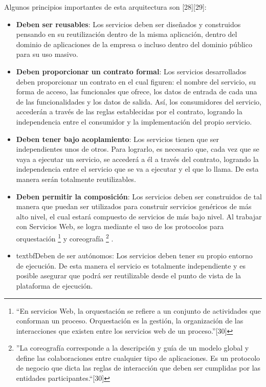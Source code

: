 Algunos principios importantes de esta arquitectura son [28][29]:
\begin{itemize}
 \item \textbf{Deben ser reusables}: Los servicios deben ser diseñados y construidos pensando en su reutilización dentro de la misma 
    aplicación, dentro del dominio de aplicaciones de la empresa o incluso dentro del dominio público para su uso masivo.
    
 \item \textbf{Deben proporcionar un contrato formal}: Los servicios desarrollados deben proporcionar un contrato en el cual figuren: 
    el nombre del servicio, su forma de acceso, las funcionales que ofrece, los datos de entrada de cada una de las funcionalidades y 
    los datos de salida. Así, los consumidores del servicio, accederán a través de las reglas establecidas por el contrato, logrando 
    la independencia entre el consumidor y la implementación del propio servicio.
    
 \item \textbf{Deben tener bajo acoplamiento}: Los servicios tienen que ser independientes  unos de otros. Para lograrlo, es necesario que,
    cada vez que se vaya a ejecutar un servicio, se accederá a él a través del contrato, logrando la independencia entre el servicio que se 
    va a ejecutar y el que lo llama. De esta manera serán totalmente reutilizables.
    
 \item \textbf{Deben permitir la composición}: Los servicios deben ser construidos de tal manera que puedan ser utilizados para construir 
    servicios genéricos de más alto nivel, el cual estará compuesto de servicios de más bajo nivel. Al trabajar con Servicios Web,  
    se logra mediante el uso de los protocolos para orquestación \footnote{``En servicios Web, la orquestación se refiere a un conjunto de
    actividades que conforman un proceso. Orquestación es la gestión, la organización de las interacciones que existen entre los servicios 
    web de un proceso.''[30] } y coreografía \footnote{''La coreografía corresponde a la descripción y guía de un modelo global y define las
    colaboraciones entre cualquier tipo de aplicaciones. Es un protocolo de negocio que dicta las reglas de interacción que deben ser
    cumplidas por las entidades participantes.``[30]} .

 \item textbf{Deben de ser autónomos}: Los servicios deben tener su propio entorno de ejecución. De esta manera el servicio es totalmente 
    independiente y es posible asegurar que  podrá ser reutilizable desde el punto de vista de la plataforma de ejecución.


\end{itemize}
